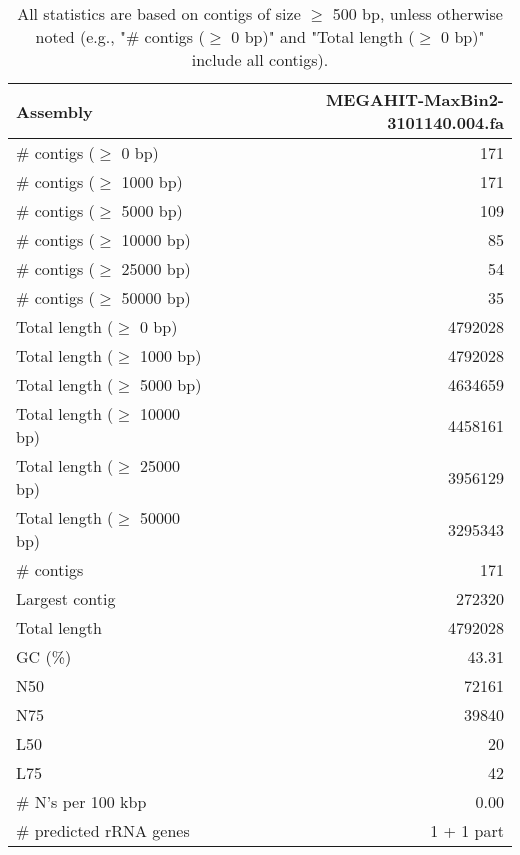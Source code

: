 \documentclass[12pt,a4paper]{article}
\begin{document}
\begin{table}[ht]
\begin{center}
\caption{All statistics are based on contigs of size $\geq$ 500 bp, unless otherwise noted (e.g., "\# contigs ($\geq$ 0 bp)" and "Total length ($\geq$ 0 bp)" include all contigs).}
\begin{tabular}{|l*{1}{|r}|}
\hline
Assembly & MEGAHIT-MaxBin2-3101140.004.fa \\ \hline
\# contigs ($\geq$ 0 bp) & 171 \\ \hline
\# contigs ($\geq$ 1000 bp) & 171 \\ \hline
\# contigs ($\geq$ 5000 bp) & 109 \\ \hline
\# contigs ($\geq$ 10000 bp) & 85 \\ \hline
\# contigs ($\geq$ 25000 bp) & 54 \\ \hline
\# contigs ($\geq$ 50000 bp) & 35 \\ \hline
Total length ($\geq$ 0 bp) & 4792028 \\ \hline
Total length ($\geq$ 1000 bp) & 4792028 \\ \hline
Total length ($\geq$ 5000 bp) & 4634659 \\ \hline
Total length ($\geq$ 10000 bp) & 4458161 \\ \hline
Total length ($\geq$ 25000 bp) & 3956129 \\ \hline
Total length ($\geq$ 50000 bp) & 3295343 \\ \hline
\# contigs & 171 \\ \hline
Largest contig & 272320 \\ \hline
Total length & 4792028 \\ \hline
GC (\%) & 43.31 \\ \hline
N50 & 72161 \\ \hline
N75 & 39840 \\ \hline
L50 & 20 \\ \hline
L75 & 42 \\ \hline
\# N's per 100 kbp & 0.00 \\ \hline
\# predicted rRNA genes & 1 + 1 part \\ \hline
\end{tabular}
\end{center}
\end{table}
\end{document}
